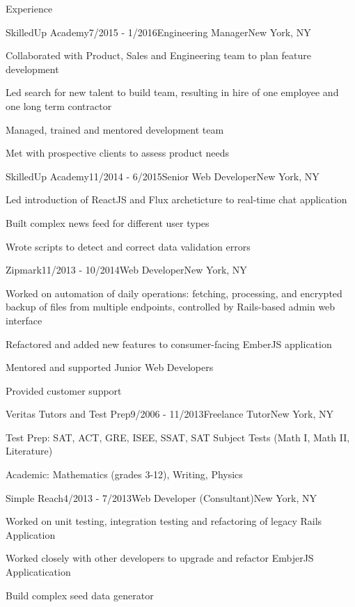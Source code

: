 \documentclass{resume} %
\begin{document}
\begin{rSection}{Experience}

\begin{rSubsection}{SkilledUp Academy}{7/2015 - 1/2016}{Engineering Manager}{New York, NY}
\item Collaborated with Product, Sales and Engineering team to plan feature development
\item Led search for new talent to build team, resulting in hire of one employee and one long term contractor
\item Managed, trained and mentored development team
\item Met with prospective clients to assess product needs
\end{rSubsection}

\begin{rSubsection}{SkilledUp Academy}{11/2014 - 6/2015}{Senior Web Developer}{New York, NY}
\item Led introduction of ReactJS and Flux archeticture to real-time chat application
\item Built complex news feed for different user types 
\item Wrote scripts to detect and correct data validation errors
\end{rSubsection}

\begin{rSubsection}{Zipmark}{11/2013 - 10/2014}{Web Developer}{New York, NY}
\item Worked on automation of daily operations: fetching, processing, and encrypted backup of files from multiple endpoints, controlled by Rails-based admin web interface
\item Refactored and added new features to consumer-facing EmberJS application
\item Mentored and supported Junior Web Developers
\item Provided customer support
\end{rSubsection}

\begin{rSubsection}{Veritas Tutors and Test Prep}{9/2006 - 11/2013}{Freelance Tutor}{New York, NY}
\item Test Prep: SAT, ACT, GRE, ISEE, SSAT, SAT Subject Tests (Math I, Math II, Literature)
\item Academic: Mathematics (grades 3-12), Writing, Physics
\end{rSubsection}

\begin{rSubsection}{Simple Reach}{4/2013 - 7/2013}{Web Developer (Consultant)}{New York, NY}
\item Worked on unit testing, integration testing and refactoring of legacy Rails Application
\item Worked closely with other developers to upgrade and refactor EmbjerJS Applicatication
\item Build complex seed data generator
\end{rSubsection}


\end{rSection}
\end{document}
